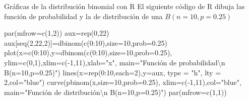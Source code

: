 \documentclass[
  ignorenonframetext,
  aspectratio=169]{beamer}
\newenvironment{Shaded}{\begin{snugshade}}{\end{snugshade}}
\newcommand{\AttributeTok}[1]{\textcolor[rgb]{0.40,0.45,0.13}{#1}}
\newcommand{\DecValTok}[1]{\textcolor[rgb]{0.68,0.00,0.00}{#1}}
\newcommand{\FloatTok}[1]{\textcolor[rgb]{0.68,0.00,0.00}{#1}}
\newcommand{\FunctionTok}[1]{\textcolor[rgb]{0.28,0.35,0.67}{#1}}
\newcommand{\NormalTok}[1]{\textcolor[rgb]{0.00,0.23,0.31}{#1}}
\newcommand{\OtherTok}[1]{\textcolor[rgb]{0.00,0.23,0.31}{#1}}
\newcommand{\SpecialCharTok}[1]{\textcolor[rgb]{0.37,0.37,0.37}{#1}}
\newcommand{\StringTok}[1]{\textcolor[rgb]{0.13,0.47,0.30}{#1}}
\begin{document}
\begin{frame}[fragile]{Gráficas de la distribución binomial con R}
\protect\hypertarget{gruxe1ficas-de-la-distribuciuxf3n-binomial-con-r}{}
El siguiente código de R dibuja las función de probabilidad y la de
distribución de una \(B(n=10,p=0.25)\)

\begin{Shaded}
\begin{Highlighting}[]
\FunctionTok{par}\NormalTok{(}\AttributeTok{mfrow=}\FunctionTok{c}\NormalTok{(}\DecValTok{1}\NormalTok{,}\DecValTok{2}\NormalTok{))}
\NormalTok{aux}\OtherTok{=}\FunctionTok{rep}\NormalTok{(}\DecValTok{0}\NormalTok{,}\DecValTok{22}\NormalTok{)}
\NormalTok{aux[}\FunctionTok{seq}\NormalTok{(}\DecValTok{2}\NormalTok{,}\DecValTok{22}\NormalTok{,}\DecValTok{2}\NormalTok{)]}\OtherTok{=}\FunctionTok{dbinom}\NormalTok{(}\FunctionTok{c}\NormalTok{(}\DecValTok{0}\SpecialCharTok{:}\DecValTok{10}\NormalTok{),}\AttributeTok{size=}\DecValTok{10}\NormalTok{,}\AttributeTok{prob=}\FloatTok{0.25}\NormalTok{)}
\FunctionTok{plot}\NormalTok{(}\AttributeTok{x=}\FunctionTok{c}\NormalTok{(}\DecValTok{0}\SpecialCharTok{:}\DecValTok{10}\NormalTok{),}\AttributeTok{y=}\FunctionTok{dbinom}\NormalTok{(}\FunctionTok{c}\NormalTok{(}\DecValTok{0}\SpecialCharTok{:}\DecValTok{10}\NormalTok{),}\AttributeTok{size=}\DecValTok{10}\NormalTok{,}\AttributeTok{prob=}\FloatTok{0.25}\NormalTok{),}
  \AttributeTok{ylim=}\FunctionTok{c}\NormalTok{(}\DecValTok{0}\NormalTok{,}\DecValTok{1}\NormalTok{),}\AttributeTok{xlim=}\FunctionTok{c}\NormalTok{(}\SpecialCharTok{{-}}\DecValTok{1}\NormalTok{,}\DecValTok{11}\NormalTok{),}\AttributeTok{xlab=}\StringTok{"x"}\NormalTok{,}
  \AttributeTok{main=}\StringTok{"Función de probabilidad}\SpecialCharTok{\textbackslash{}n}\StringTok{ B(n=10,p=0.25)"}\NormalTok{)}
\FunctionTok{lines}\NormalTok{(}\AttributeTok{x=}\FunctionTok{rep}\NormalTok{(}\DecValTok{0}\SpecialCharTok{:}\DecValTok{10}\NormalTok{,}\AttributeTok{each=}\DecValTok{2}\NormalTok{),}\AttributeTok{y=}\NormalTok{aux, }\AttributeTok{type =} \StringTok{"h"}\NormalTok{, }\AttributeTok{lty =} \DecValTok{2}\NormalTok{,}\AttributeTok{col=}\StringTok{"blue"}\NormalTok{)}
\FunctionTok{curve}\NormalTok{(}\FunctionTok{pbinom}\NormalTok{(x,}\AttributeTok{size=}\DecValTok{10}\NormalTok{,}\AttributeTok{prob=}\FloatTok{0.25}\NormalTok{),}
  \AttributeTok{xlim=}\FunctionTok{c}\NormalTok{(}\SpecialCharTok{{-}}\DecValTok{1}\NormalTok{,}\DecValTok{11}\NormalTok{),}\AttributeTok{col=}\StringTok{"blue"}\NormalTok{,}
  \AttributeTok{main=}\StringTok{"Función de distribución}\SpecialCharTok{\textbackslash{}n}\StringTok{ B(n=10,p=0.25)"}\NormalTok{)}
\FunctionTok{par}\NormalTok{(}\AttributeTok{mfrow=}\FunctionTok{c}\NormalTok{(}\DecValTok{1}\NormalTok{,}\DecValTok{1}\NormalTok{))}
\end{Highlighting}
\end{Shaded}
\end{frame}
\end{document}
